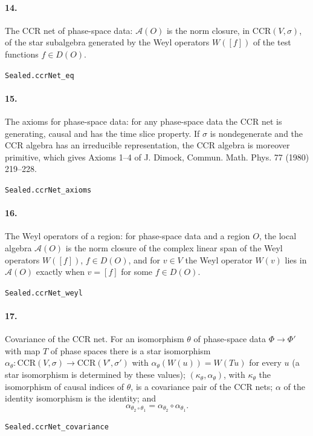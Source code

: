 \documentclass[11pt]{article}
\begin{document}
\paragraph{14.} The CCR net of phase-space data: $\mathcal A(O)$ is the norm closure, in $\mathrm{CCR}(V, \sigma)$, of the star subalgebra generated by the Weyl operators $W([f])$ of the test functions $f \in D(O)$.\par{\footnotesize\texttt{Sealed.ccrNet\_eq}}

\paragraph{15.} The axioms for phase-space data: for any phase-space data the CCR net is generating, causal and has the time slice property. If $\sigma$ is nondegenerate and the CCR algebra has an irreducible representation, the CCR algebra is moreover primitive, which gives Axioms 1–4 of J. Dimock, Commun. Math. Phys. 77 (1980) 219–228.\par{\footnotesize\texttt{Sealed.ccrNet\_axioms}}

\paragraph{16.} The Weyl operators of a region: for phase-space data and a region $O$, the local algebra $\mathcal A(O)$ is the norm closure of the complex linear span of the Weyl operators $W([f])$, $f \in D(O)$, and for $v \in V$ the Weyl operator $W(v)$ lies in $\mathcal A(O)$ exactly when $v = [f]$ for some $f \in D(O)$.\par{\footnotesize\texttt{Sealed.ccrNet\_weyl}}

\paragraph{17.} Covariance of the CCR net. For an isomorphism $\theta$ of phase-space data $\Phi \to \Phi'$ with map $T$ of phase spaces there is a star isomorphism $\alpha_\theta : \mathrm{CCR}(V, \sigma) \to \mathrm{CCR}(V', \sigma')$ with $\alpha_\theta(W(u)) = W(T u)$ for every $u$ (a star isomorphism is determined by these values); $(\kappa_\theta, \alpha_\theta)$, with $\kappa_\theta$ the isomorphism of causal indices of $\theta$, is a covariance pair of the CCR nets; $\alpha$ of the identity isomorphism is the identity; and \[\alpha_{\theta_2 \circ \theta_1} = \alpha_{\theta_2} \circ \alpha_{\theta_1}.\]\par{\footnotesize\texttt{Sealed.ccrNet\_covariance}}
\end{document}
